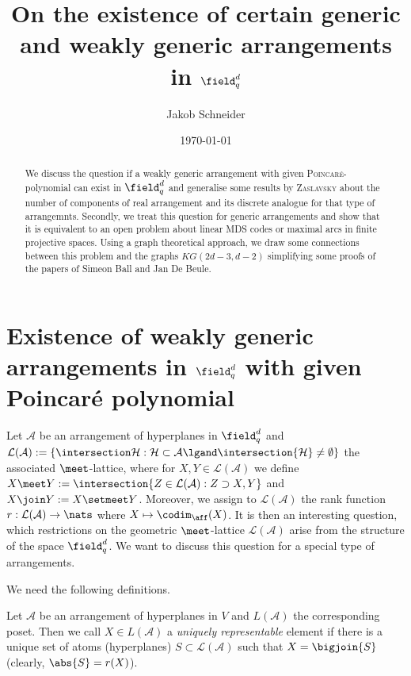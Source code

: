 \message{ !name(OnTheRAIDProblem.tex)}\documentclass[8pt,a4paper]{article}
\begin{document}

\title{On the existence of certain generic and weakly generic arrangements in $\field_q^d$}
\author{Jakob Schneider}
\date{\today}
\maketitle
\begin{abstract}
We discuss the question if a weakly generic arrangement with given \textsc{Poincaré}-polynomial can exist in $\field_q^d$ and generalise some results by \textsc{Zaslavsky} about the number of components of real arrangement and its discrete analogue for that type of arrangemnts.
Secondly, we treat this question for generic arrangements and show that it is equivalent to an open problem about linear MDS codes or maximal arcs in finite projective spaces.
Using a graph theoretical approach, we draw some connections between this problem and the graphs $KG(2d-3,d-2)$ simplifying some proofs of the papers of Simeon Ball and Jan De Beule.
\end{abstract}

\section{Existence of weakly generic arrangements in $\field_q^d$ with given Poincaré polynomial}

Let $\mathcal{A}$ be an arrangement of hyperplanes in $\field_q^d$ and $\mathcal{L}(\mathcal{A}):=\{\intersection \mathcal{H} : \mathcal{H}\subset \mathcal{A} \lgand \intersection{\mathcal{H}}\neq \emptyset\}$ the associated $\meet$-lattice, where for $X,Y\in\mathcal{L}(\mathcal{A})$ we define $X\meet Y:=\intersection\{Z\in\mathcal{L}(\mathcal{A}):Z\supset X,Y\}$ and $X\join Y:= X\setmeet Y$.
Moreover, we assign to $\mathcal{L}(\mathcal{A})$ the rank function $r:\mathcal{L(\mathcal{A})}\to \nats$ where $X\mapsto \codim_{\aff}(X)$.
It is then an interesting question, which restrictions on the geometric $\meet$-lattice $\mathcal{L}(\mathcal{A})$ arise from the structure of the space $\field_q^d$. We want to discuss this question for a special type of arrangements.

We need the following definitions.

\begin{definition} Let $\mathcal{A}$ be an arrangement of hyperplanes in $V$ and $L(\mathcal{A})$ the corresponding poset. Then we call $X\in L(\mathcal{A})$ a \emph{uniquely representable} element if there is a unique set of atoms (hyperplanes) $S\subset\mathcal{L}(\mathcal{A})$ such that $X=\bigjoin {S}$ (clearly, $\abs{S}=r(X)$).
\end{definition}
\end{document}
